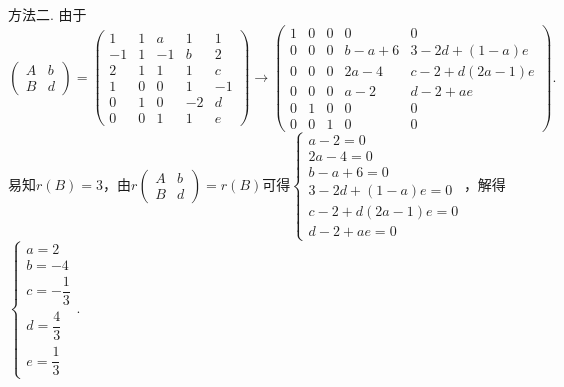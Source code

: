 \documentclass[12pt,fontset=fandol]{ctexart}
\begin{document}
\begin{solve}
        方法二. 由于
        \[\begin{pmatrix}
                A & b \\
                B & d
            \end{pmatrix}=
            \begin{pmatrix}
                1  & 1 & a  & 1  & 1  \\
                -1 & 1 & -1 & b  & 2  \\
                2  & 1 & 1  & 1  & c  \\
                1  & 0 & 0  & 1  & -1 \\
                0  & 1 & 0  & -2 & d  \\
                0  & 0 & 1  & 1  & e
            \end{pmatrix}\rightarrow
            \begin{pmatrix}
                1 & 0 & 0 & 0     & 0            \\
                0 & 0 & 0 & b-a+6 & 3-2d+(1-a)e  \\
                0 & 0 & 0 & 2a-4  & c-2+d(2a-1)e \\
                0 & 0 & 0 & a-2   & d-2+ae       \\
                0 & 1 & 0 & 0     & 0            \\
                0 & 0 & 1 & 0     & 0
            \end{pmatrix}.\]
        易知$r(B)=3$，由$r\begin{pmatrix}
                A & b \\
                B & d
            \end{pmatrix}=r(B)$可得$\begin{cases}
                a-2=0          \\
                2a-4=0         \\
                b-a+6=0        \\
                3-2d+(1-a)e=0  \\
                c-2+d(2a-1)e=0 \\
                d-2+ae=0
            \end{cases}$，解得$\begin{cases}
                a=2          \\
                b=-4         \\
                c=-\dfrac 13 \\[1ex]
                d=\dfrac 43  \\[1ex]
                e=\dfrac 13
            \end{cases}$.
\end{solve}
\end{document}
